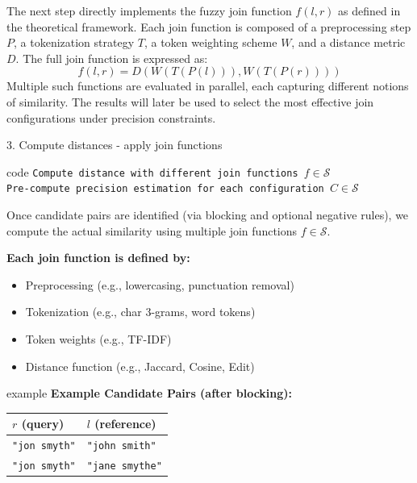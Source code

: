\documentclass[8pt]{beamer} %
\begin{document}
\begin{frame}
	The next step directly implements the fuzzy join function $f(l, r)$ as defined in the theoretical framework. Each join function is composed of a preprocessing step $P$, a tokenization strategy $T$, a token weighting scheme $W$, and a distance metric $D$. The full join function is expressed as:
	\[
	f(l, r) = D(W(T(P(l))), W(T(P(r))))
	\]
	Multiple such functions are evaluated in parallel, each capturing different notions of similarity. The results will later be used to select the most effective join configurations under precision constraints.
	
\end{frame}


\begin{frame}{3. Compute distances - apply join functions}
	
	\begin{beamercolorbox}[rounded=true, shadow=true, leftskip=1em, rightskip=1em]{code}
	\texttt{Compute distance with different join functions $f \in \mathcal{S}$}\\
	\texttt{Pre-compute precision estimation for each configuration $C \in \mathcal{S}$}
	\end{beamercolorbox}
	
	\vspace{0.5em}
	Once candidate pairs are identified (via blocking and optional negative rules), we compute the actual similarity using multiple join functions $f \in \mathcal{S}$.
	
	\vspace{0.5em}
	\textbf{Each join function is defined by:}
	\begin{itemize}
		\item Preprocessing (e.g., lowercasing, punctuation removal)
		\item Tokenization (e.g., char 3-grams, word tokens)
		\item Token weights (e.g., TF-IDF)
		\item Distance function (e.g., Jaccard, Cosine, Edit)
	\end{itemize}
	
	\vspace{0.5em}
	\begin{beamercolorbox}[rounded=true, shadow=true, leftskip=1em, rightskip=1em]{example}
		\textbf{Example Candidate Pairs (after blocking):}
		\begin{tabular}{ll}
			$r$ (query) & $l$ (reference) \\
			\hline
			\texttt{"jon smyth"} & \texttt{"john smith"} \\
			\texttt{"jon smyth"} & \texttt{"jane smythe"} \\
		\end{tabular}
		

\end{beamercolorbox}
\end{frame}
\end{document}
